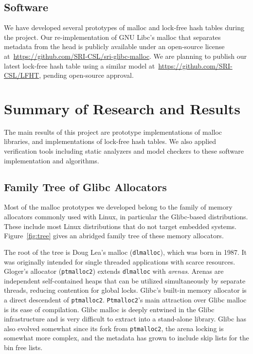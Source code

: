 \documentclass[twoside,12pt]{cslreport}
\begin{document}
\section{Software}

We have developed several prototypes of malloc and lock-free hash
tables during the project. Our re-implementation of GNU Libc's malloc
that separates metadata from the head is publicly available under an
open-source license
at~\url{https://github.com/SRI-CSL/sri-glibc-malloc}.  We are planning
to publish our latest lock-free hash table using a similar model
at~\url{https://github.com/SRI-CSL/LFHT}, pending open-source approval.



\chapter{Summary of Research and Results}

The main results of this project are prototype implementations of
malloc libraries, and implementations of lock-free hash tables. We
also applied verification tools including static analyzers and model
checkers to these software implementation and algorithms.

\section{Family Tree of Glibc Allocators}
\label{family-tree}

Most of the malloc prototypes we developed belong to the family of
memory allocators commonly used with Linux, in particular the
Glibc-based distributions.  These include most Linux distributions
that do not target embedded systems. Figure~\ref{fig:tree} gives an
abridged family tree of these memory allocators.

The root of the tree is Doug Lea's malloc (\texttt{dlmalloc}), which
was born in 1987.  It was originally intended for single threaded
applications with scarce resources.
%
Gloger's allocator (\texttt{ptmalloc2}) extends \texttt{dlmalloc} with
\emph{arenas}.  Arenas are independent self-contained heaps that can
be utilized simultaneously by separate threads, reducing contention
for global locks.
%
Glibc's built-in memory allocator is a direct descendent of
\texttt{ptmalloc2}. \texttt{Ptmalloc2}'s main attraction over Glibc
malloc is its ease of compilation. Glibc malloc is deeply entwined in
the Glibc infrastructure and is very difficult to extract into a
stand-alone library.  Glibc has also evolved somewhat since its fork
from \texttt{ptmalloc2}, the arena locking is somewhat more complex,
and the metadata has grown to include skip lists for the bin free
lists.
\end{document}
